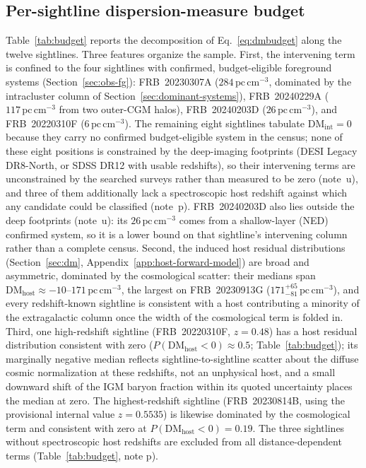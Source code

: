 \subsection{Per-sightline dispersion-measure budget}
\label{sec:results-budget}
\label{sec:budget}

Table~\ref{tab:budget} reports the decomposition of Eq.~\ref{eq:dmbudget}
along the twelve sightlines. Three features organize the sample. First, the
intervening term is confined to the four sightlines with confirmed,
budget-eligible foreground systems (Section~\ref{sec:obs-fg}):
FRB~20230307A ($284\,\mathrm{pc\,cm^{-3}}$, dominated by the intracluster
column of Section~\ref{sec:dominant-systems}), FRB~20240229A
($117\,\mathrm{pc\,cm^{-3}}$ from two outer-CGM halos), FRB~20240203D
($26\,\mathrm{pc\,cm^{-3}}$), and FRB~20220310F ($6\,\mathrm{pc\,cm^{-3}}$).
The remaining eight sightlines tabulate $\mathrm{DM_{int}}=0$ because they
carry no confirmed budget-eligible system in the census;
none of these eight positions is constrained by the deep-imaging footprints
(DESI Legacy DR8-North, or SDSS DR12 with usable redshifts), so their
intervening terms are unconstrained by the searched surveys rather than
measured to be zero (note~u), and three of them additionally lack a
spectroscopic host redshift against which any candidate could be classified
(note~p). FRB~20240203D also lies outside the deep footprints (note~u): its
$26\,\mathrm{pc\,cm^{-3}}$ comes from a shallow-layer (NED) confirmed
system, so it is a lower bound on that sightline's intervening column rather
than a complete census.
Second, the induced host residual distributions
(Section~\ref{sec:dm}, Appendix~\ref{app:host-forward-model}) are broad and
asymmetric, dominated by the cosmological scatter: their medians span
$\mathrm{DM_{host}}\approx-10$--$171\,\mathrm{pc\,cm^{-3}}$, the largest on
FRB~20230913G ($171^{+65}_{-81}\,\mathrm{pc\,cm^{-3}}$), and every
redshift-known sightline is consistent with a host contributing a minority of
the extragalactic column once the width of the cosmological term is folded in.
Third, one high-redshift sightline (FRB~20220310F, $z=0.48$) has a host
residual distribution consistent with zero ($P(\mathrm{DM_{host}}<0)\approx0.5$;
Table~\ref{tab:budget}); its marginally negative median reflects
sightline-to-sightline scatter about the diffuse cosmic normalization at
these redshifts, not an unphysical host, and a small downward shift of the
IGM baryon fraction within its quoted uncertainty places the median at zero.
The highest-redshift sightline (FRB~20230814B, using the
provisional internal value $z=0.5535$) is
likewise dominated by the cosmological term and consistent with zero at
$P(\mathrm{DM_{host}}<0)=0.19$. The three sightlines without
spectroscopic host redshifts are excluded from all distance-dependent terms
(Table~\ref{tab:budget}, note p).


